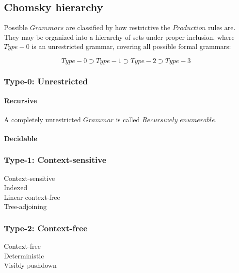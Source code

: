 \documentclass{article}
\begin{document}
\subsection{Chomsky hierarchy}

Possible $Grammars$ are classified by how restrictive the $Production$
rules are. They may be organized into a hierarchy of sets under proper
inclusion, where $Type-0$ is an unrestricted grammar, covering all
possible formal grammars:

\[
    Type-0 \supset Type-1 \supset Type-2 \supset Type-3
\]

\subsubsection{Type-0: Unrestricted}

    \paragraph{Recursive}
    A completely unrestricted $Grammar$ is called $Recursively$ $enumerable$.

    \paragraph{Decidable}

\subsubsection{Type-1: Context-sensitive}

    \begin{description}

    \item[Context-sensitive]

    \item[Indexed]

    \item[Linear context-free]

    \item[Tree-adjoining]

    \end{description}

\subsubsection{Type-2: Context-free}

    \begin{description}

    \item[Context-free]

    \item[Deterministic]

    \item[Visibly pushdown]

    \end{description}
\end{document}
